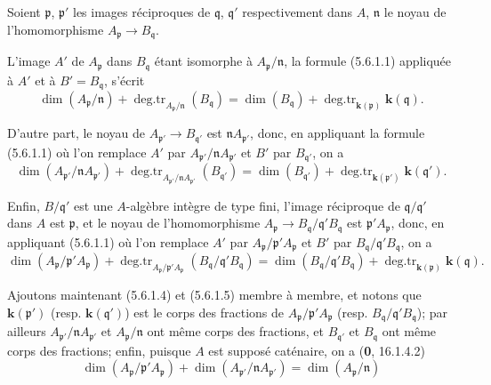 Soient $\mathfrak p$, $\mathfrak p'$ les images réciproques de
$\mathfrak q$, $\mathfrak q'$ respectivement dans $A$, $\mathfrak n$ le
noyau de l'homomorphisme $A_{\mathfrak p}\to B_{\mathfrak q}$.

L'image $A'$ de $A_{\mathfrak p}$ dans $B_{\mathfrak q}$ étant isomorphe à
$A_{\mathfrak p}/\mathfrak n$, la formule (5.6.1.1) appliquée à $A'$ et à
$B'=B_{\mathfrak q}$, s'écrit
\begin{equation}
\dim(A_{\mathfrak p}/\mathfrak n)
+\operatorname{deg.tr}_{A_{\mathfrak p}/\mathfrak n}(B_{\mathfrak q})
=\dim(B_{\mathfrak q})
+\operatorname{deg.tr}_{\mathbf{k}(\mathfrak p)}\boldsymbol{k}(\mathfrak q).
\tag{5.6.1.3}\label{IV.2.s5.6.1.3-fr}
\end{equation}

D'autre part, le noyau de $A_{\mathfrak p'}\to B_{\mathfrak q'}$ est
$\mathfrak nA_{\mathfrak p'}$, donc, en appliquant la formule (5.6.1.1) où
l'on remplace $A'$ par $A_{\mathfrak p'}/\mathfrak nA_{\mathfrak p'}$ et
$B'$ par $B_{\mathfrak q'}$, on a
\begin{equation}
\dim(A_{\mathfrak p'}/\mathfrak nA_{\mathfrak p'})
+\operatorname{deg.tr}_{A_{\mathfrak p'}/\mathfrak nA_{\mathfrak p'}}
(B_{\mathfrak q'})
=\dim(B_{\mathfrak q'})
+\operatorname{deg.tr}_{\mathbf{k}(\mathfrak p')}\boldsymbol{k}(\mathfrak q').
\tag{5.6.1.4}\label{IV.2.s5.6.1.4-fr}
\end{equation}

Enfin, $B/\mathfrak q'$ est une $A$-algèbre intègre de type fini, l'image
réciproque de $\mathfrak q/\mathfrak q'$ dans $A$ est $\mathfrak p$, et le
noyau de l'homomorphisme
$A_{\mathfrak p}\to B_{\mathfrak q}/\mathfrak q'B_{\mathfrak q}$ est
$\mathfrak p'A_{\mathfrak p}$, donc, en appliquant (5.6.1.1) où l'on
remplace $A'$ par $A_{\mathfrak p}/\mathfrak p'A_{\mathfrak p}$ et $B'$ par
$B_{\mathfrak q}/\mathfrak q'B_{\mathfrak q}$, on a
\begin{equation}
\dim(A_{\mathfrak p}/\mathfrak p'A_{\mathfrak p})
+\operatorname{deg.tr}_{A_{\mathfrak p}/\mathfrak p'A_{\mathfrak p}}
(B_{\mathfrak q}/\mathfrak q'B_{\mathfrak q})
=\dim(B_{\mathfrak q}/\mathfrak q'B_{\mathfrak q})
+\operatorname{deg.tr}_{\mathbf{k}(\mathfrak p)}\boldsymbol{k}(\mathfrak q).
\tag{5.6.1.5}\label{IV.2.s5.6.1.5-fr}
\end{equation}

Ajoutons maintenant (5.6.1.4) et (5.6.1.5) membre à membre, et notons que
$\boldsymbol{k}(\mathfrak p')$ (resp. $\boldsymbol{k}(\mathfrak q')$) est le corps des fractions de
$A_{\mathfrak p}/\mathfrak p'A_{\mathfrak p}$ (resp.
$B_{\mathfrak q}/\mathfrak q'B_{\mathfrak q}$); par ailleurs
$A_{\mathfrak p'}/\mathfrak nA_{\mathfrak p'}$ et
$A_{\mathfrak p}/\mathfrak n$ ont même corps des fractions, et
$B_{\mathfrak q'}$ et $B_{\mathfrak q}$ ont même corps des fractions;
enfin, puisque $A$ est supposé caténaire, on a (\textbf{0}, 16.1.4.2)
\[
\dim(A_{\mathfrak p}/\mathfrak p'A_{\mathfrak p})
+\dim(A_{\mathfrak p'}/\mathfrak nA_{\mathfrak p'})
=\dim(A_{\mathfrak p}/\mathfrak n)
\]

